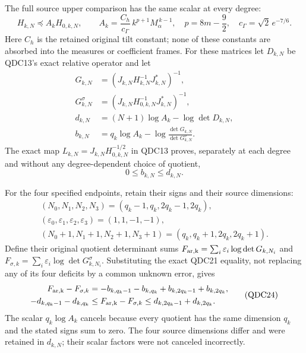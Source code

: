 The full source upper comparison has the same scalar at every
degree:
\[
 H_{k,N}\preceq A_kH_{0,k,N},\qquad
 A_k=\frac{C_h}{c_\Gamma}\,k^{p+1}M_\alpha^{\,k-1},
 \quad p=8m-\frac92,\quad c_\Gamma=\sqrt2\,e^{-7/6}.
 \tag{QDC20}
\]
Here $C_h$ is the retained original tilt constant; none of these
constants are absorbed into the measures or coefficient frames.
For these matrices let $D_{k,N}$ be QDC13's exact relative
operator and let
\[
 \begin{split}
 G_{k,N}&=(J_{k,N}H_{k,N}^{-1}J_{k,N}^*)^{-1},\\
 G^\sigma_{k,N}
   &=(J_{k,N}H_{0,k,N}^{-1}J_{k,N}^*)^{-1},\\
 d_{k,N}&=(N+1)\log A_k-\log\det D_{k,N},\\
 b_{k,N}&=q_k\log A_k
                -\log\frac{\det G_{k,N}}{\det G^\sigma_{k,N}}.
 \end{split}
 \tag{QDC21}
\]
The exact map $L_{k,N}=J_{k,N}H_{0,k,N}^{-1/2}$ in
QDC13 proves, separately at each degree and without any
degree-dependent choice of quotient,
\[
 0\le b_{k,N}\le d_{k,N}.
 \tag{QDC22}
\]

For the four specified endpoints, retain their signs and
their source dimensions:
\[
 \begin{gathered}
 (N_0,N_1,N_2,N_3)=(q_k-1,q_k,2q_k-1,2q_k),\\
 (\varepsilon_0,\varepsilon_1,\varepsilon_2,\varepsilon_3)
      =(1,1,-1,-1),\\
 (N_0+1,N_1+1,N_2+1,N_3+1)
      =(q_k,q_k+1,2q_k,2q_k+1).
 \end{gathered}
 \tag{QDC23}
\]
Define their original quotient determinant sums
$F_{\rm ar,k}=\sum_i\varepsilon_i\log\det G_{k,N_i}$
and
$F_{\sigma,k}=\sum_i\varepsilon_i\log\det G^\sigma_{k,N_i}$.
Substituting the exact QDC21 equality, not replacing any
of its four deficits by a common unknown error, gives
\[
 \begin{split}
 F_{\rm ar,k}-F_{\sigma,k}
 &=-b_{k,q_k-1}-b_{k,q_k}
                  +b_{k,2q_k-1}+b_{k,2q_k},\\
 -d_{k,q_k-1}-d_{k,q_k}
 &\le F_{\rm ar,k}-F_{\sigma,k}
 \le d_{k,2q_k-1}+d_{k,2q_k}.
 \end{split}
 \tag{QDC24}
\]
The scalar $q_k\log A_k$ cancels because every quotient
has the same dimension $q_k$ and the stated signs sum to zero.
The four source dimensions differ and were retained in
$d_{k,N}$; their scalar factors were not canceled incorrectly.

